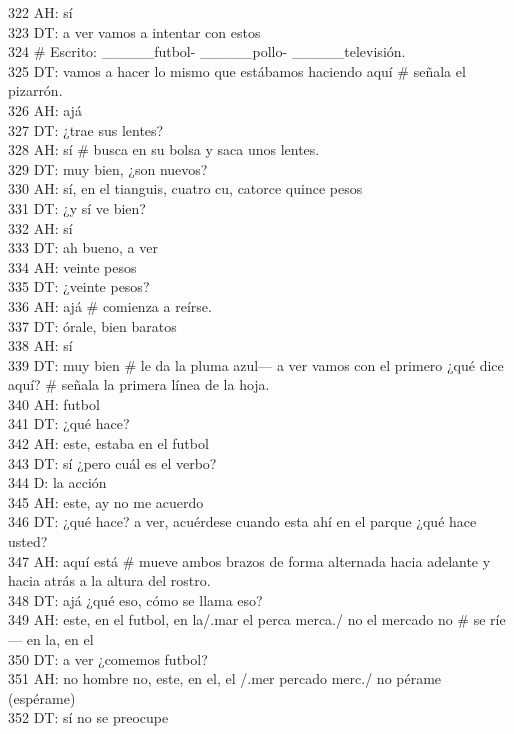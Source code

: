 322 AH: sí\\
323 DT: a ver vamos a intentar con estos\\
324 \# Escrito: \_\_\_\_\_futbol- \_\_\_\_\_pollo- \_\_\_\_\_televisión.\\
325 DT: vamos a hacer lo mismo que estábamos haciendo aquí \# señala el pizarrón.\\
326 AH: ajá\\
327 DT: ¿trae sus lentes?\\
328 AH: sí \# busca en su bolsa y saca unos lentes.\\
329 DT: muy bien, ¿son nuevos?\\
330 AH: sí, en el tianguis, cuatro cu, catorce quince pesos\\
331 DT: ¿y sí ve bien?\\
332 AH: sí\\
333 DT: ah bueno, a ver\\
334 AH: veinte pesos\\
335 DT: ¿veinte pesos?\\
336 AH: ajá \# comienza a reírse.\\
337 DT: órale, bien baratos\\
338 AH: sí\\
339 DT: muy bien \# le da la pluma azul--- a ver vamos con el primero ¿qué dice aquí? \# señala la primera línea de la hoja.\\
340 AH: futbol\\
341 DT: ¿qué hace?\\
342 AH: este, estaba en el futbol\\
343 DT: sí ¿pero cuál es el verbo?\\
344 D: la acción\\
345 AH: este, ay no me acuerdo\\
346 DT: ¿qué hace? a ver, acuérdese cuando esta ahí en el parque ¿qué hace usted?\\
347 AH: aquí está \# mueve ambos brazos de forma alternada hacia adelante y hacia atrás a la altura del rostro.\\
348 DT: ajá ¿qué eso, cómo se llama eso?\\
349 AH: este, en el futbol, en la/.mar el perca merca./ no el mercado no \# se ríe--- en la, en el\\
350 DT: a ver ¿comemos futbol?\\
351 AH: no hombre no, este, en el, el /.mer percado merc./ no pérame (espérame)\\
352 DT: sí no se preocupe\\
